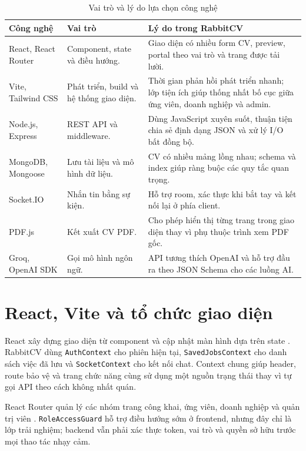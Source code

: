 \begin{table}[H]
    \centering
    \small
    \begin{tabularx}{\textwidth}{|p{}|p{}|Y|} \hline
        \textbf{Công nghệ} & \textbf{Vai trò} & \textbf{Lý do trong RabbitCV} \\ \hline
        React, React Router & Component, state và điều hướng. & Giao diện có nhiều form CV, preview, portal theo vai trò và trang được tải lười. \\ \hline
        Vite, Tailwind CSS & Phát triển, build và hệ thống giao diện. & Thời gian phản hồi phát triển nhanh; lớp tiện ích giúp thống nhất bố cục giữa ứng viên, doanh nghiệp và admin. \\ \hline
        Node.js, Express & REST API và middleware. & Dùng JavaScript xuyên suốt, thuận tiện chia sẻ định dạng JSON và xử lý I/O bất đồng bộ. \\ \hline
        MongoDB, Mongoose & Lưu tài liệu và mô hình dữ liệu. & CV có nhiều mảng lồng nhau; schema và index giúp ràng buộc các quy tắc quan trọng. \\ \hline
        Socket.IO & Nhắn tin bằng sự kiện. & Hỗ trợ room, xác thực khi bắt tay và kết nối lại ở phía client. \\ \hline
        PDF.js & Kết xuất CV PDF. & Cho phép hiển thị từng trang trong giao diện thay vì phụ thuộc trình xem PDF gốc. \\ \hline
        Groq, OpenAI SDK & Gọi mô hình ngôn ngữ. & API tương thích OpenAI và hỗ trợ đầu ra theo JSON Schema cho các luồng AI. \\ \hline
    \end{tabularx}
    \caption{Vai trò và lý do lựa chọn công nghệ}
    \label{tab:technology-choice}
\end{table}

\section{React, Vite và tổ chức giao diện}

React xây dựng giao diện từ component và cập nhật màn hình dựa trên state \cite{reactdocs}. RabbitCV dùng \texttt{AuthContext} cho phiên hiện tại, \texttt{SavedJobsContext} cho danh sách việc đã lưu và \texttt{SocketContext} cho kết nối chat. Context chung giúp header, route bảo vệ và trang chức năng cùng sử dụng một nguồn trạng thái thay vì tự gọi API theo cách không nhất quán.

React Router quản lý các nhóm trang công khai, ứng viên, doanh nghiệp và quản trị viên \cite{reactrouterdocs}. \texttt{RoleAccessGuard} hỗ trợ điều hướng sớm ở frontend, nhưng đây chỉ là lớp trải nghiệm; backend vẫn phải xác thực token, vai trò và quyền sở hữu trước mọi thao tác nhạy cảm.

